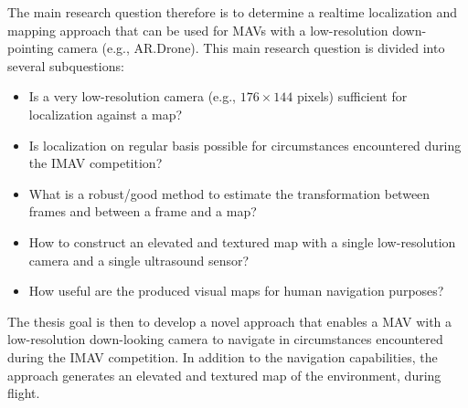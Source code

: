 The main research question therefore is to determine a realtime localization and mapping approach that can be used for MAVs with a low-resolution down-pointing camera (e.g., AR.Drone).
This main research question is divided into several subquestions:
\begin{itemize}
\item Is a very low-resolution camera (e.g., $176 \times 144$ pixels) sufficient for localization against a map?
\item Is localization on regular basis possible for circumstances encountered during the IMAV competition?
\item What is a robust/good method to estimate the transformation between frames and between a frame and a map?
\item How to construct an elevated and textured map with a single low-resolution camera and a single ultrasound sensor?
\item How useful are the produced visual maps for human navigation purposes?
\end{itemize}
The thesis goal is then to develop a novel approach that enables a MAV with a low-resolution down-looking camera to navigate in circumstances encountered during the IMAV competition.
In addition to the navigation capabilities, the approach generates an elevated and textured map of the environment, during flight.

